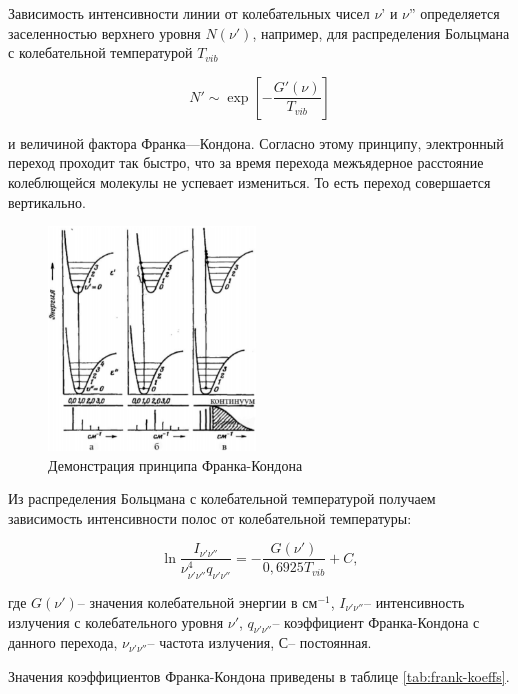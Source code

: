 Зависимость интенсивности линии от колебательных чисел $\nu$' и $\nu$'' определяется заселенностью верхнего уровня $N(\nu')$, например, для распределения Больцмана с колебательной температурой $T_{vib}$

\begin{equation}
N' \sim \exp \left[ -\frac{G'(\nu)}{T_{vib}} \right]
\end{equation}

и величиной фактора Франка—Кондона. Согласно этому принципу, электронный переход проходит так быстро, что за время перехода межъядерное расстояние колеблющейся молекулы не успевает измениться. То есть переход совершается вертикально.

\begin{figure}[H]
	\begin{center}
		\includegraphics[width=0.49\textwidth]{fk.png}
		\caption{Демонстрация принципа Франка-Кондона}
	\end{center}	
\end{figure}

Из распределения Больцмана с колебательной температурой получаем зависимость интенсивности полос от колебательной температуры: 

\begin{equation}
\ln{\frac{I_{\nu' \nu ''}}{{\nu}_{\nu' \nu''}^4 q_{\nu' \nu''}}} = - \frac{G(\nu')}{0,6925T_{vib}} + C,
\end{equation}

где $G(\nu')$-- значения колебательной энергии в $\text{см}^{-1}$, $I_{\nu' \nu ''}$-- интенсивность излучения с колебательного уровня $\nu'$, $q_{\nu' \nu''}$-- коэффициент Франка-Кондона с данного перехода, ${\nu}_{\nu' \nu''}$-- частота излучения, С-- постоянная.

Значения коэффициентов Франка-Кондона приведены в таблице \ref{tab:frank-koeffs}.

